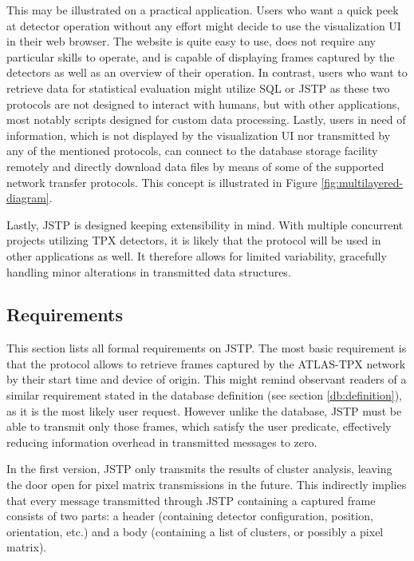 This may be illustrated on a practical application. Users who want a quick peek at detector operation without any effort might decide to use the visualization UI in their web browser. The website is quite easy to use, does not require any particular skills to operate, and is capable of displaying frames captured by the detectors as well as an overview of their operation. In contrast, users who want to retrieve data for statistical evaluation might utilize SQL or JSTP as these two protocols are not designed to interact with humans, but with other applications, most notably scripts designed for custom data processing. Lastly, users in need of information, which is not displayed by the visualization UI nor transmitted by any of the mentioned protocols, can connect to the database storage facility remotely and directly download data files by means of some of the supported network transfer protocols. This concept is illustrated in Figure \ref{fig:multilayered-diagram}.

Lastly, JSTP is designed keeping extensibility in mind. With multiple concurrent projects utilizing TPX detectors, it is likely that the protocol will be used in other applications as well. It therefore allows for limited variability, gracefully handling minor alterations in transmitted data structures.
\todo %

\subsection{Requirements}
This section lists all formal requirements on JSTP. The most basic requirement is that the protocol allows to retrieve frames captured by the ATLAS-TPX network by their start time and device of origin. This might remind observant readers of a similar requirement stated in the database definition (see section \ref{db:definition}), as it is the most likely user request. However unlike the database, JSTP must be able to transmit only those frames, which satisfy the user predicate, effectively reducing information overhead in transmitted messages to zero.

In the first version, JSTP only transmits the results of cluster analysis, leaving the door open for pixel matrix transmissions in the future. This indirectly implies that every message transmitted through JSTP containing a captured frame consists of two parts: a header (containing detector configuration, position, orientation, etc.) and a body (containing a list of clusters, or possibly a pixel matrix).

